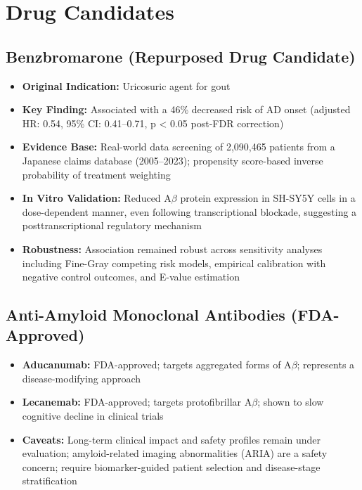 \documentclass[11pt, a4paper]{article}
\begin{document}
\section{Drug Candidates}

\subsection{Benzbromarone (Repurposed Drug Candidate)}
\begin{itemize}
    \item \textbf{Original Indication:} Uricosuric agent for gout
    \item \textbf{Key Finding:} Associated with a 46\% decreased risk of AD onset (adjusted HR: 0.54, 95\% CI: 0.41--0.71, p \textless{} 0.05 post-FDR correction)
    \item \textbf{Evidence Base:} Real-world data screening of 2,090,465 patients from a Japanese claims database (2005--2023); propensity score-based inverse probability of treatment weighting
    \item \textbf{In Vitro Validation:} Reduced A$\beta$ protein expression in SH-SY5Y cells in a dose-dependent manner, even following transcriptional blockade, suggesting a posttranscriptional regulatory mechanism
    \item \textbf{Robustness:} Association remained robust across sensitivity analyses including Fine-Gray competing risk models, empirical calibration with negative control outcomes, and E-value estimation
\end{itemize}

\subsection{Anti-Amyloid Monoclonal Antibodies (FDA-Approved)}
\begin{itemize}
    \item \textbf{Aducanumab:} FDA-approved; targets aggregated forms of A$\beta$; represents a disease-modifying approach
    \item \textbf{Lecanemab:} FDA-approved; targets protofibrillar A$\beta$; shown to slow cognitive decline in clinical trials
    \item \textbf{Caveats:} Long-term clinical impact and safety profiles remain under evaluation; amyloid-related imaging abnormalities (ARIA) are a safety concern; require biomarker-guided patient selection and disease-stage stratification
\end{itemize}
\end{document}
